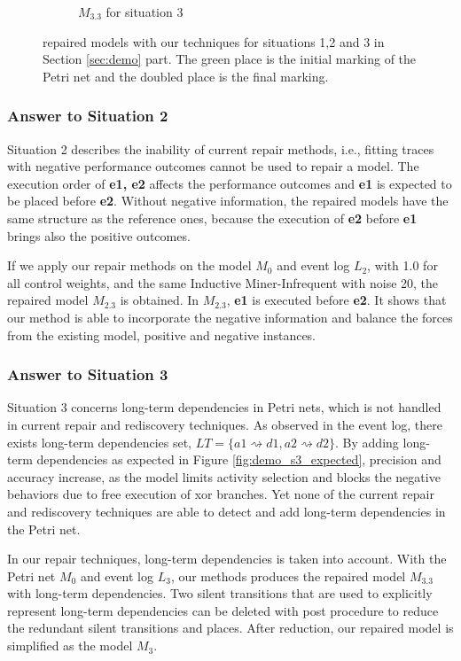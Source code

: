 \begin{figure}[htp]
\begin{subfigure}[b]{0.32\textwidth}
	\caption{ $M_{3.3}$ for situation 3}
	\label{fig:demo_dfg_s3}
\end{subfigure}
	\caption[Repaired models with Dfg-repair based on motivating examples]{repaired models with our techniques for situations 1,2 and 3 in Section \ref{sec:demo} part. The green place is the initial marking of the Petri net and the doubled place is the final marking.}
	\label{fig:demo_dfg}
\end{figure}
\subsubsection{Answer to Situation 2}
Situation 2 describes the inability of current repair methods, i.e., fitting traces with negative performance outcomes cannot be used to repair a model. 
The execution order of \textbf{e1, e2} affects the performance outcomes and \textbf{e1} is expected to be placed before \textbf{e2}. Without negative information, the repaired models have the same structure as the reference ones, because the execution of \textbf{e2} before \textbf{e1} brings also the positive outcomes. 

If we apply our repair methods on the model $M_0$ and event log $L_2$, with 1.0 for all control weights, and the same Inductive Miner-Infrequent with noise 20, the repaired model $M_{2.3}$ is obtained. In $M_{2.3}$, \textbf{e1} is executed before \textbf{e2}. It shows that our method is able to incorporate the negative information and balance the forces from the existing model, positive and negative instances. 

\subsubsection{Answer to Situation 3}
Situation 3 concerns long-term dependencies in Petri nets, which is not handled in current repair and rediscovery techniques. As observed in the event log, there exists long-term dependencies set, $LT=\{ a1\rightsquigarrow d1, a2\rightsquigarrow d2\}$.  By adding long-term dependencies as expected in Figure \ref{fig:demo_s3_expected}, precision and accuracy increase, as the model limits activity selection and blocks the negative behaviors due to free execution of xor branches. Yet none of the current repair and rediscovery techniques are able to detect and add long-term dependencies in the Petri net. 

In our repair techniques, long-term dependencies is taken into account. With the Petri net $M_0$ and event log $L_3$, our methods produces the repaired model $M_{3.3}$ with long-term dependencies. Two silent transitions that are used to explicitly represent long-term dependencies can be deleted with post procedure to reduce the redundant silent transitions and places. After reduction, our repaired model is simplified as the model $M_{3}$. 
